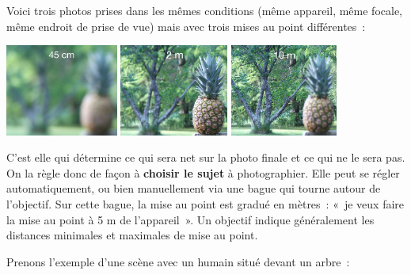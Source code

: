 \documentclass[../../main/main.tex]{subfiles}
\begin{document}
Voici trois photos prises dans les mêmes conditions (même appareil, même focale,
même endroit de prise de vue) mais avec trois mises au point différentes~:
\begin{center}
	\includegraphics[height=3cm]{miseaupt-45cm.png}
	\includegraphics[height=3cm]{miseaupt-2m.png}
	\includegraphics[height=3cm]{miseaupt-10m.png}
\end{center}

C'est elle qui détermine ce qui sera net sur la photo finale et ce qui ne le
sera pas. On la règle donc de façon à \textbf{choisir le sujet} à photographier.
Elle peut se régler automatiquement,
ou bien manuellement via une bague qui tourne autour de l'objectif. Sur cette
bague, la mise au point est gradué en mètres~: «~je veux faire la mise au point
à 5 m de l'appareil~». Un objectif indique généralement les distances minimales
et maximales de mise au point.

Prenons l'exemple d'une scène avec un humain situé devant un arbre~:
\end{document}
